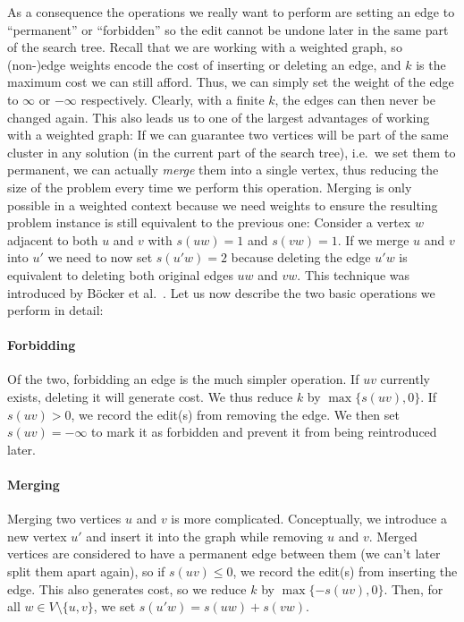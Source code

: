 \documentclass[12pt,oneside,english,parskip=full,headings=small]{scrbook}
\theoremstyle{definition}
\begin{document}
As a consequence the operations we really want to perform are setting an edge to ``permanent'' or
``forbidden'' so the edit cannot be undone later in the same part of the search tree. Recall that we
are working with a weighted graph, so (non-)edge weights encode the cost of inserting or deleting an
edge, and $k$ is the maximum cost we can still afford. Thus, we can simply set the weight of the
edge to $\infty$ or $-\infty$ respectively. Clearly, with a finite $k$, the edges can then never be
changed again. This also leads us to one of the largest advantages of working with a weighted graph:
If we can guarantee two vertices will be part of the same cluster in any solution (in the current
part of the search tree), i.e.\ we set them to permanent, we can actually \emph{merge} them into a
single vertex, thus reducing the size of the problem every time we perform this operation. Merging
is only possible in a weighted context because we need weights to ensure the resulting problem
instance is still equivalent to the previous one: Consider a vertex $w$ adjacent to both $u$ and $v$
with $s(uw) = 1$ and $s(vw) = 1$. If we merge $u$ and $v$ into $u'$ we need to now set $s(u'w) = 2$
because deleting the edge $u'w$ is equivalent to deleting both original edges $uw$ and $vw$. This
technique was introduced by Böcker et al.~\cite{AnApproach}. Let us now describe the two basic
operations we perform in detail:

\paragraph{Forbidding} Of the two, forbidding an edge is the much simpler operation. If $uv$
currently exists, deleting it will generate cost. We thus reduce $k$ by $\max\{s(uv), 0\}$. If $s(uv)
> 0$, we record the edit(s) from removing the edge. We then set $s(uv) = -\infty$ to mark it as
forbidden and prevent it from being reintroduced later.

\paragraph{Merging} \label{sec:merging} Merging two vertices $u$ and $v$ is more complicated.
Conceptually, we introduce a new vertex $u'$ and insert it into the graph while removing $u$ and
$v$. Merged vertices are considered to have a permanent edge between them (we can't later split them
apart again), so if $s(uv) \leq 0$, we record the edit(s) from inserting the edge. This also
generates cost, so we reduce $k$ by $\max\{-s(uv), 0\}$. Then, for all $w \in V \setminus \{u, v\}$,
we set $s(u'w) = s(uw) + s(vw)$.
\end{document}
